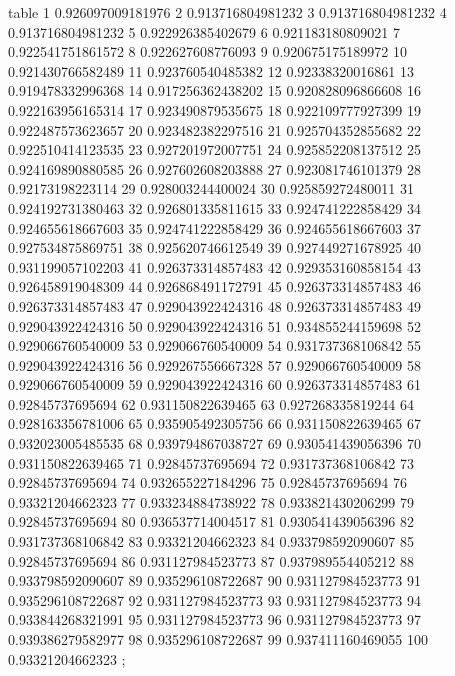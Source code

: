 table {%
	1 0.926097009181976
	2 0.913716804981232
	3 0.913716804981232
	4 0.913716804981232
	5 0.922926385402679
	6 0.921183180809021
	7 0.922541751861572
	8 0.922627608776093
	9 0.920675175189972
	10 0.921430766582489
	11 0.923760540485382
	12 0.92338320016861
	13 0.919478332996368
	14 0.917256362438202
	15 0.920828096866608
	16 0.922163956165314
	17 0.923490879535675
	18 0.922109777927399
	19 0.922487573623657
	20 0.923482382297516
	21 0.925704352855682
	22 0.922510414123535
	23 0.927201972007751
	24 0.925852208137512
	25 0.924169890880585
	26 0.927602608203888
	27 0.923081746101379
	28 0.92173198223114
	29 0.928003244400024
	30 0.925859272480011
	31 0.924192731380463
	32 0.926801335811615
	33 0.924741222858429
	34 0.924655618667603
	35 0.924741222858429
	36 0.924655618667603
	37 0.927534875869751
	38 0.925620746612549
	39 0.927449271678925
	40 0.931199057102203
	41 0.926373314857483
	42 0.929353160858154
	43 0.926458919048309
	44 0.926868491172791
	45 0.926373314857483
	46 0.926373314857483
	47 0.929043922424316
	48 0.926373314857483
	49 0.929043922424316
	50 0.929043922424316
	51 0.934855244159698
	52 0.929066760540009
	53 0.929066760540009
	54 0.931737368106842
	55 0.929043922424316
	56 0.929267556667328
	57 0.929066760540009
	58 0.929066760540009
	59 0.929043922424316
	60 0.926373314857483
	61 0.92845737695694
	62 0.931150822639465
	63 0.927268335819244
	64 0.928163356781006
	65 0.935905492305756
	66 0.931150822639465
	67 0.932023005485535
	68 0.939794867038727
	69 0.930541439056396
	70 0.931150822639465
	71 0.92845737695694
	72 0.931737368106842
	73 0.92845737695694
	74 0.932655227184296
	75 0.92845737695694
	76 0.93321204662323
	77 0.933234884738922
	78 0.933821430206299
	79 0.92845737695694
	80 0.936537714004517
	81 0.930541439056396
	82 0.931737368106842
	83 0.93321204662323
	84 0.933798592090607
	85 0.92845737695694
	86 0.931127984523773
	87 0.937989554405212
	88 0.933798592090607
	89 0.935296108722687
	90 0.931127984523773
	91 0.935296108722687
	92 0.931127984523773
	93 0.931127984523773
	94 0.933844268321991
	95 0.931127984523773
	96 0.931127984523773
	97 0.939386279582977
	98 0.935296108722687
	99 0.937411160469055
	100 0.93321204662323
};
